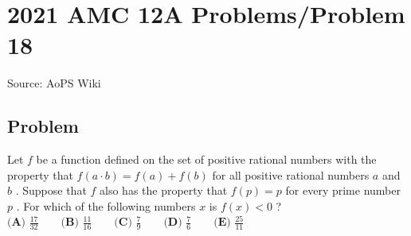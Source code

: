 \documentclass[12pt]{article}
\begin{document}
\section*{{2021 AMC 12A Problems/Problem 18}}
Source: AoPS Wiki

\subsection*{Problem}
Let $f$ be a function defined on the set of positive rational numbers with the property that $f(a\cdot b)=f(a)+f(b)$ for all positive rational numbers $a$ and $b$ . Suppose that $f$ also has the property that $f(p)=p$ for every prime number $p$ . For which of the following numbers $x$ is $f(x)<0$ ? $\textbf{(A) }\frac{17}{32} \qquad \textbf{(B) }\frac{11}{16} \qquad \textbf{(C) }\frac79 \qquad \textbf{(D) }\frac76\qquad \textbf{(E) }\frac{25}{11}$
\end{document}
